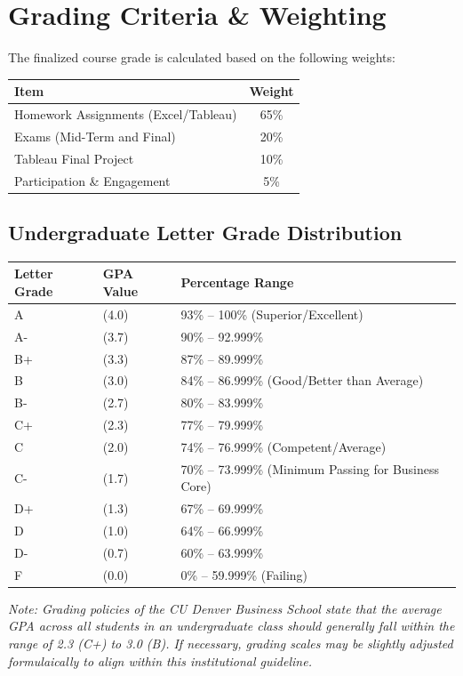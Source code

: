 \documentclass[11pt,a4paper]{article}
\begin{document}
\section*{Grading Criteria \& Weighting}
The finalized course grade is calculated based on the following weights:
\begin{center}
    \begin{tabular}{lc}
        \toprule
        \textbf{Item} & \textbf{Weight} \\
        \midrule
        Homework Assignments (Excel/Tableau) & 65\% \\
        Exams (Mid-Term and Final) & 20\% \\
        Tableau Final Project & 10\% \\
        Participation \& Engagement & 5\% \\
        \bottomrule
    \end{tabular}
\end{center}

\subsection*{Undergraduate Letter Grade Distribution}
\begin{center}
    \begin{tabular}{llp{7cm}}
        \toprule
        \textbf{Letter Grade} & \textbf{GPA Value} & \textbf{Percentage Range} \\
        \midrule
        A  & (4.0) & 93\% -- 100\% (Superior/Excellent) \\
        A- & (3.7) & 90\% -- 92.999\% \\
        B+ & (3.3) & 87\% -- 89.999\% \\
        B  & (3.0) & 84\% -- 86.999\% (Good/Better than Average) \\
        B- & (2.7) & 80\% -- 83.999\% \\
        C+ & (2.3) & 77\% -- 79.999\% \\
        C  & (2.0) & 74\% -- 76.999\% (Competent/Average) \\
        C- & (1.7) & 70\% -- 73.999\% (Minimum Passing for Business Core) \\
        D+ & (1.3) & 67\% -- 69.999\% \\
        D  & (1.0) & 64\% -- 66.999\% \\
        D- & (0.7) & 60\% -- 63.999\% \\
        F  & (0.0) & 0\% -- 59.999\% (Failing) \\
        \bottomrule
    \end{tabular}
\end{center}
\textit{Note: Grading policies of the CU Denver Business School state that the average GPA across all students in an undergraduate class should generally fall within the range of 2.3 (C+) to 3.0 (B). If necessary, grading scales may be slightly adjusted formulaically to align within this institutional guideline.}
\end{document}
